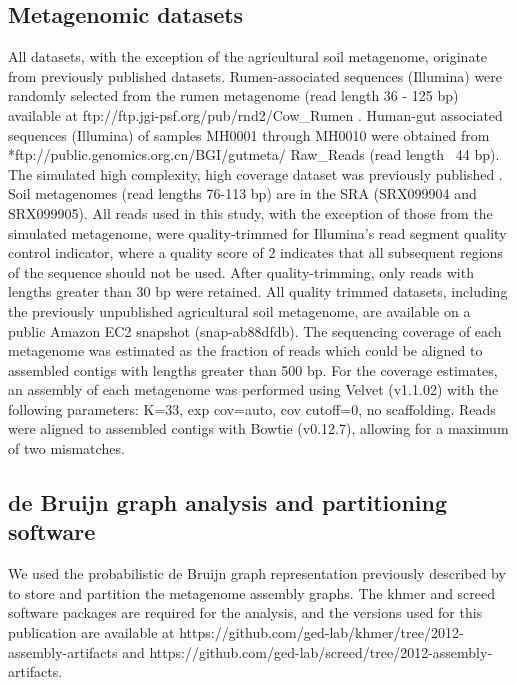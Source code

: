 \documentclass[10pt]{article}
\begin{document}
\subsection*{Metagenomic datasets}
All datasets, with the exception of the agricultural soil metagenome,
originate from previously published datasets. Rumen-associated
sequences (Illumina) were randomly selected from the rumen metagenome (read length 36 - 125 bp)
available at ftp://ftp.jgi-psf.org/pub/rnd2/Cow\_Rumen
\cite{Hess:2011p686}. Human-gut associated sequences (Illumina) of
samples MH0001 through MH0010 were obtained from 
\\*ftp://public.genomics.org.cn/BGI/gutmeta/ Raw\_Reads
\cite{Qin:2010p189} (read length ~44 bp).  The simulated high complexity, high coverage
dataset was previously published \cite{Pignatelli:2011p742}.  Soil metagenomes (read lengths 76-113 bp) are in the SRA (SRX099904 and SRX099905). All
reads used in this study, with the exception of those from the simulated
metagenome, were quality-trimmed for Illumina's read segment quality
control indicator, where a quality score of 2 indicates that all
subsequent regions of the sequence should not be used. After
quality-trimming, only reads with lengths greater than 30 bp were
retained. All quality trimmed datasets, including the previously
unpublished agricultural soil metagenome, are available on a public
Amazon EC2 snapshot (snap-ab88dfdb).  The sequencing coverage of each
metagenome was estimated as the fraction of reads which could be
aligned to assembled contigs with lengths greater than 500 bp.  For
the coverage estimates, an assembly of each metagenome was performed
using Velvet (v1.1.02) with the following parameters: K=33, exp
cov=auto, cov cutoff=0, no scaffolding.  Reads were aligned to
assembled contigs with Bowtie (v0.12.7), allowing for a maximum of two
mismatches.

\subsection*{de Bruijn graph analysis and partitioning software}

We used the probabilistic de Bruijn graph representation previously described by \cite{Pell:2012cq}  to store and partition the metagenome assembly
graphs.  The khmer and screed software packages are required for the analysis,
and the versions used for this publication are available at {\sf https://github.com/ged-lab/khmer/tree/2012-assembly-artifacts} and {\sf https://github.com/ged-lab/screed/tree/2012-assembly-artifacts}.
\end{document}
